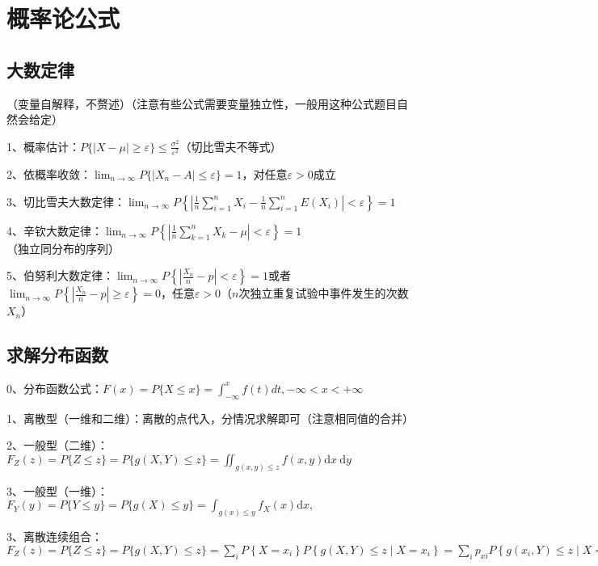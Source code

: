 \chapter{概率论公式}

\section{大数定律}

（变量自解释，不赘述）（注意有些公式需要变量独立性，一般用这种公式题目自然会给定）

1、概率估计：$P\{|X-\mu| \geqslant \varepsilon\} \leqslant \frac{\sigma^{2}}{\varepsilon^{2}}$（切比雪夫不等式）

2、依概率收敛：$\lim_{n \rightarrow \infty} P\{|X_n-A| \le \varepsilon \}=1$，对任意$\varepsilon > 0$成立

3、切比雪夫大数定律：$\lim_{n \rightarrow \infty} P\left\{\left|\frac{1}{n} \sum_{i=1}^{n} X_{i}-\frac{1}{n} \sum_{i=1}^{n} E\left(X_{i}\right)\right|<\varepsilon\right\}=1$

4、辛钦大数定律：$\lim_{n \rightarrow \infty} P\left\{\left|\frac{1}{n} \sum_{k=1}^{n} X_{k}-\mu\right|<\varepsilon\right\}=1$（独立同分布的序列）

5、伯努利大数定律：$\lim_{n \rightarrow \infty} P\left\{\left|\frac{X_n}{n}-p\right|<\varepsilon\right\}=1$或者$\lim_{n \rightarrow \infty} P\left\{\left|\frac{X_n}{n}-p\right| \geqslant \varepsilon\right\}=0$，任意$\varepsilon>0$（$n$次独立重复试验中事件发生的次数$X_n$）

\section{求解分布函数}

0、分布函数公式：$F(x) = P\{ X \le x\}=\int_{-\infty}^xf(t)dt,-\infty <x<+\infty$

1、离散型（一维和二维）：离散的点代入，分情况求解即可（注意相同值的合并）

2、一般型（二维）：$F_{Z}(z)=P\{Z \leqslant z\}=P\{g(X, Y) \leqslant z\}=\iint_{g(x, y) \leqslant z} f(x, y) \mathrm{d} x \mathrm{~d} y$

3、一般型（一维）：$F_{Y}(y)=P\{Y \leqslant y\}=P\{g(X) \leqslant y\}=\int_{g(x) \leqslant y} f_{X}(x) \mathrm{d} x, $

3、离散连续组合：$F_{Z}(z)=P\{Z \leqslant z\}=P\{g(X, Y) \leqslant z\} =\sum_{i} P\left\{X=x_{i}\right\} P\left\{g(X, Y) \leqslant z \mid X=x_{i}\right\}=\sum_{i} p_{xi} P\left\{g\left(x_{i}, Y\right) \leqslant z \mid X=x_{i}\right\}$

